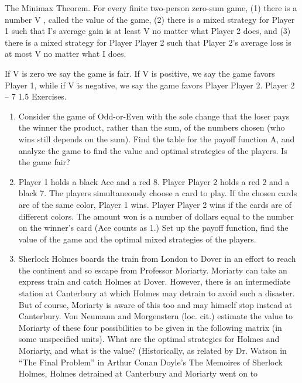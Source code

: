 \documentclass[]{report}
\begin{document}
\begin{framed}
The Minimax Theorem. For every finite two-person zero-sum game,
(1) there is a number V , called the value of the game,
(2) there is a mixed strategy for Player 1 such that I’s average gain is at least V no
matter what Player 2 does, and
(3) there is a mixed strategy for Player Player 2 such that Player 2’s average loss is at most V no
matter what I does.
\end{framed}
If V is zero we say the game is fair. If V is positive, we say the game
favors Player 1, while if V is negative, we say the game favors Player Player 2.
Player 2 – 7
1.5 Exercises.
\begin{enumerate}
\item Consider the game of Odd-or-Even with the sole change that the loser pays the
winner the product, rather than the sum, of the numbers chosen (who wins still depends
on the sum). Find the table for the payoff function A, and analyze the game to find the
value and optimal strategies of the players. Is the game fair?
\item  Player 1 holds a black Ace and a red 8. Player Player 2 holds a red 2 and a black 7. The
players simultaneously choose a card to play. If the chosen cards are of the same color,
Player 1 wins. Player Player 2 wins if the cards are of different colors. The amount won is a
number of dollars equal to the number on the winner’s card (Ace counts as 1.) Set up the
payoff function, find the value of the game and the optimal mixed strategies of the players.
\item  Sherlock Holmes boards the train from London to Dover in an effort to reach the
continent and so escape from Professor Moriarty. Moriarty can take an express train and
catch Holmes at Dover. However, there is an intermediate station at Canterbury at which
Holmes may detrain to avoid such a disaster. But of course, Moriarty is aware of this too
and may himself stop instead at Canterbury. Von Neumann and Morgenstern (loc. cit.)
estimate the value to Moriarty of these four possibilities to be given in the following matrix
(in some unspecified units).
What are the optimal strategies for Holmes and Moriarty, and what is the value? (Historically,
as related by Dr. Watson in “The Final Problem” in Arthur Conan Doyle’s The
Memoires of Sherlock Holmes, Holmes detrained at Canterbury and Moriarty went on to

\end{enumerate}
\end{document}
